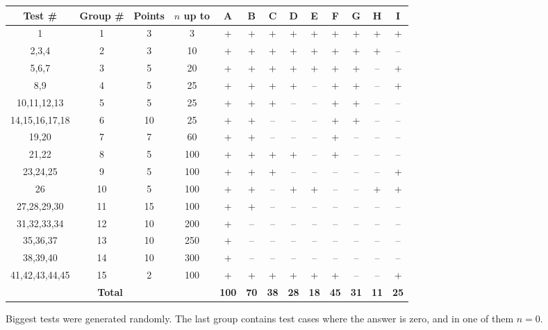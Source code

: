 \documentclass{boistyle}
\begin{document}
\begin{tabular}{|c|c|c|c|c|c|c|c|c|c|c|c|c|}
    \hline
    \bf{Test \#} & \bf{Group \#} & \bf{Points} & \bf{$n$ up to} & \bf{A} & \bf{B} & \bf{C} & \bf{D} & \bf{E} & \bf{F} & \bf{G} & \bf{H} & \bf{I} \\ \hline
    1                       & 1 & 3 & 3      & + & + & + & + & + & + & + & + & + \\ \hline
    2,3,4                 & 2 & 3 & 10    & + & + & + & + & + & + & + & + & -- \\ \hline
    5,6,7                 & 3 & 5 & 20    & + & + & + & + & + & + & + & -- & + \\ \hline
    8,9                    & 4 & 5 & 25    & + & + & + & + & -- & + & + & -- & + \\ \hline
    10,11,12,13      & 5 & 5 & 25    & + & + & + & -- & -- & + & + & -- & -- \\ \hline
    14,15,16,17,18 & 6 & 10 & 25  & + & + & -- & -- & -- & + & + & -- & -- \\ \hline
    19,20                & 7 & 7 & 60    & + & + & -- & -- & -- & + & -- & -- & -- \\ \hline
    21,22                & 8 & 5 & 100  & + & + & + & + & -- & + & -- & -- & -- \\ \hline
    23,24,25           & 9 & 5 & 100  & + & + & + & -- & -- & -- & -- & -- & + \\ \hline
    26                     & 10 & 5 & 100 & + & + & -- & + & + & -- & -- & + & + \\ \hline
    27,28,29,30      & 11 & 15 & 100 & + & + & -- & -- & -- & -- & -- & -- & -- \\ \hline
    31,32,33,34      & 12 & 10 & 200 & + & -- & -- & -- & -- & -- & -- & -- & -- \\ \hline
    35,36,37           & 13 & 10 & 250 & + & -- & -- & -- & -- & -- & -- & -- & -- \\ \hline
    38,39,40           & 14 & 10 & 300 & + & -- & -- & -- & -- & -- & -- & -- & -- \\ \hline
    41,42,43,44,45 & 15 & 2 & 100   & + & + & + & + & + & + & -- & -- & + \\ \hline
    \multicolumn{4}{|c|}{\bf Total } & \bf{100} & \bf{70} & \bf{38} & \bf{28} & \bf{18} & \bf{45} & \bf{31} & \bf{11} & \bf{25} \\ \hline
    
\end{tabular}

Biggest tests were generated randomly.
The last group contains test cases where the answer is zero, and in one of them $n = 0$.
\end{document}
